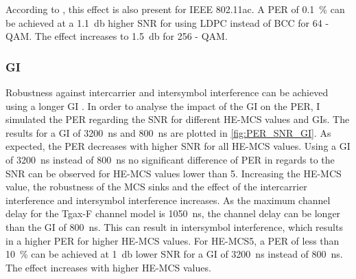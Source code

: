 According to \textcite{tran_asic_2014}, this effect is also present for IEEE 802.11ac. A \ac{PER} of \SI{0.1}{\percent} can be achieved at a
\SI{1.1}{\decibel} higher \ac{SNR} for using \ac{LDPC} instead of \ac{BCC} for 64 - \ac{QAM}. The effect increases to \SI{1.5}{\decibel} for 256 - \ac{QAM}.

\subsubsection*{\acf{GI}}

Robustness against intercarrier and intersymbol interference can be achieved using a longer \ac{GI} \cite{pulimamidi_development_2007}. In order to analyse the impact of the \ac{GI} on the \ac{PER},
I simulated the \ac{PER} regarding the \ac{SNR} for different HE-MCS values and \ac{GI}s. The results for a \ac{GI} of \SI{3200}{\nano\second} and \SI{800}{\nano\second} are plotted in \autoref{fig:PER_SNR_GI}.
As expected, the \ac{PER} decreases with higher \ac{SNR} for all HE-MCS values. Using a \ac{GI} of \SI{3200}{\nano\second} instead of \SI{800}{\nano\second} no significant difference of \ac{PER} in regards to the \ac{SNR} can be observed for HE-\ac{MCS} values lower than \num{5}.
Increasing the HE-\ac{MCS} value, the robustness of the \ac{MCS} sinks and the effect of the intercarrier interference and intersymbol interference increases.
As the maximum channel delay for the Tgax-F channel model is \SI{1050}{\nano\second}, the channel delay can be longer than the \ac{GI} of \SI{800}{\nano\second}. This
can result in intersymbol interference, which results in a higher \ac{PER} for higher HE-\ac{MCS} values.
For HE-\ac{MCS}\num{5}, a \ac{PER} of less than \SI{10}{\percent} can be achieved at \SI{1}{\decibel} lower \ac{SNR} for a \ac{GI} of \SI{3200}{\nano\second} instead of \SI{800}{\nano\second}. The effect increases
with higher HE-\ac{MCS} values.

